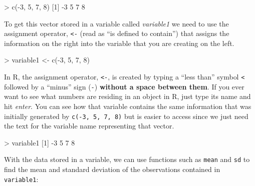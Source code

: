 \documentclass[
]{book}
\newenvironment{Shaded}{\begin{snugshade}}{\end{snugshade}}
\newcommand{\DecValTok}[1]{\textcolor[rgb]{0.00,0.00,0.81}{#1}}
\newcommand{\FunctionTok}[1]{\textcolor[rgb]{0.00,0.00,0.00}{#1}}
\newcommand{\NormalTok}[1]{#1}
\newcommand{\OtherTok}[1]{\textcolor[rgb]{0.56,0.35,0.01}{#1}}
\newcommand{\SpecialCharTok}[1]{\textcolor[rgb]{0.00,0.00,0.00}{#1}}
\begin{document}
\begin{Shaded}
\begin{Highlighting}[]
\SpecialCharTok{\textgreater{}} \FunctionTok{c}\NormalTok{(}\SpecialCharTok{{-}}\DecValTok{3}\NormalTok{, }\DecValTok{5}\NormalTok{, }\DecValTok{7}\NormalTok{, }\DecValTok{8}\NormalTok{)}
\NormalTok{[}\DecValTok{1}\NormalTok{] }\SpecialCharTok{{-}}\DecValTok{3} \DecValTok{5} \DecValTok{7} \DecValTok{8}
\end{Highlighting}
\end{Shaded}

To get this vector stored in a variable called \emph{variable1} we need to
use the assignment operator, \texttt{\textless{}-} (read as ``is defined to contain'') that assigns
the information on the right into the variable that you are creating on
the left.

\begin{Shaded}
\begin{Highlighting}[]
\SpecialCharTok{\textgreater{}}\NormalTok{ variable1 }\OtherTok{\textless{}{-}} \FunctionTok{c}\NormalTok{(}\SpecialCharTok{{-}}\DecValTok{3}\NormalTok{, }\DecValTok{5}\NormalTok{, }\DecValTok{7}\NormalTok{, }\DecValTok{8}\NormalTok{)}
\end{Highlighting}
\end{Shaded}

In R, the assignment operator, \texttt{\textless{}-}, is created by typing a
``less than'' symbol \texttt{\textless{}} followed by a ``minus'' sign (\texttt{-})
\textbf{without a space between them}. If you
ever want to see what numbers are residing in an object in R, just type
its name and hit \emph{enter}. You can see how that variable contains the same
information that was initially generated by
\texttt{c(-3,\ 5,\ 7,\ 8)} but is easier to access since we just need the text
for the variable name representing that vector.

\begin{Shaded}
\begin{Highlighting}[]
\SpecialCharTok{\textgreater{}}\NormalTok{ variable1}
\NormalTok{[}\DecValTok{1}\NormalTok{] }\SpecialCharTok{{-}}\DecValTok{3} \DecValTok{5} \DecValTok{7} \DecValTok{8}
\end{Highlighting}
\end{Shaded}

With the data stored in a variable, we can use functions such as
\texttt{mean} and
\texttt{sd} to find the mean and standard deviation of the observations contained in
\texttt{variable1}:
\end{document}
